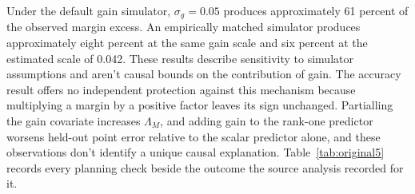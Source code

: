 Under the default gain simulator, $\sigma_g=0.05$ produces approximately 61 percent of the observed margin excess. An empirically matched simulator produces approximately eight percent at the same gain scale and six percent at the estimated scale of 0.042. These results describe sensitivity to simulator assumptions and aren't causal bounds on the contribution of gain. The accuracy result offers no independent protection against this mechanism because multiplying a margin by a positive factor leaves its sign unchanged. Partialling the gain covariate increases $\Lambda_M$, and adding gain to the rank-one predictor worsens held-out point error relative to the scalar predictor alone, and these observations don't identify a unique causal explanation. Table~\ref{tab:original5} records every planning check beside the outcome the source analysis recorded for it.

